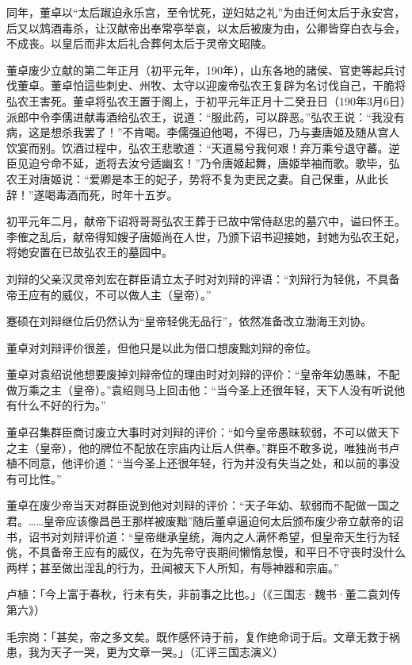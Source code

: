 同年，董卓以“太后踧迫永乐宫，至令忧死，逆妇姑之礼”为由迁何太后于永安宫，后又以鸩酒毒杀，让汉献帝出奉常亭举哀，以太后被废为由，公卿皆穿白衣与会，不成丧。以皇后而非太后礼合葬何太后于灵帝文昭陵。

董卓废少立献的第二年正月（初平元年，190年），山东各地的諸侯、官吏等起兵讨伐董卓。董卓怕這些刺史、州牧、太守以迎废帝弘农王复辟为名讨伐自己，干脆将弘农王害死。董卓将弘农王置于阁上，于初平元年正月十二癸丑日（190年3月6日）派郎中令李儒进献毒酒给弘农王，说道：“服此药，可以辟恶。”弘农王说：“我没有病，这是想杀我罢了！”不肯喝。李儒强迫他喝，不得已，乃与妻唐姬及随从宫人饮宴而别。饮酒过程中，弘农王悲歌道：“天道易兮我何艰！弃万乘兮退守蕃。逆臣见迫兮命不延，逝将去汝兮适幽玄！”乃令唐姬起舞，唐姬举袖而歌。歌毕，弘农王对唐姬说：“爱卿是本王的妃子，势将不复为吏民之妻。自己保重，从此长辞！”遂喝毒酒而死，时年十五岁。

初平元年二月，献帝下诏将哥哥弘农王葬于已故中常侍赵忠的墓穴中，谥曰怀王。李傕之乱后，献帝得知嫂子唐姬尚在人世，乃颁下诏书迎接她，封她为弘农王妃，将她安置在已故弘农王的墓园中。

刘辩的父亲汉灵帝刘宏在群臣请立太子时对刘辩的评语：“刘辩行为轻佻，不具备帝王应有的威仪，不可以做人主（皇帝）。”

蹇硕在刘辩继位后仍然认为“皇帝轻佻无品行”，依然准备改立渤海王刘协。

董卓对刘辩评价很差，但他只是以此为借口想废黜刘辩的帝位。

董卓对袁绍说他想要废掉刘辩帝位的理由时对刘辩的评价：“皇帝年幼愚昧，不配做万乘之主（皇帝）。”袁绍则马上回击他：“当今圣上还很年轻，天下人没有听说他有什么不好的行为。”

董卓召集群臣商讨废立大事时对刘辩的评价：“如今皇帝愚昧软弱，不可以做天下之主（皇帝），他的牌位不配放在宗庙内让后人供奉。”群臣不敢多说，唯独尚书卢植不同意，他评价道：“当今圣上还很年轻，行为并没有失当之处，和以前的事没有可比性。”

董卓在废少帝当天对群臣说到他对刘辩的评价：“天子年幼、软弱而不配做一国之君。……皇帝应该像昌邑王那样被废黜”随后董卓逼迫何太后颁布废少帝立献帝的诏书，诏书对刘辩评价道：“皇帝继承皇统，海内之人满怀希望，但皇帝天生行为轻佻，不具备帝王应有的威仪，在为先帝守丧期间懒惰怠慢，和平日不守丧时没什么两样；甚至做出淫乱的行为，丑闻被天下人所知，有辱神器和宗庙。”

卢植：「今上富于春秋，行未有失，非前事之比也。」（《三国志·魏书·董二袁刘传第六》）

毛宗岗：「甚矣，帝之多文矣。既作感怀诗于前，复作绝命词于后。文章无救于祸患，我为天子一哭，更为文章一哭。」（汇评三国志演义）

